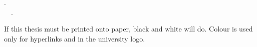 \vspace*{\fill}

\begin{information}

\thetitle. \\
\textcopyright~\theyear~\theauthor.

If this thesis must be printed onto paper, black and white will do.
Colour is used only for hyperlinks and in the university logo.

\end{information}

\vspace{5em}
